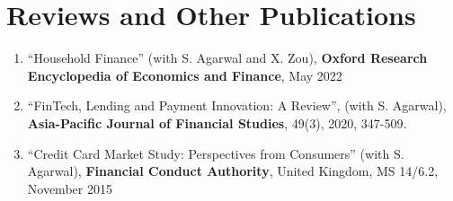 \documentclass[margin,line]{res}
\begin{document}
\begin{resume}
\begin{enumerate}

\end{enumerate}

\section{\sc Reviews and Other Publications}
\begin{enumerate}
\item %
``Household Finance'' (with S. Agarwal and X. Zou), \textbf{Oxford Research Encyclopedia of Economics and Finance}, May 2022
\vspace*{0.2cm} 	
\item %
``FinTech, Lending and Payment Innovation: A Review'', (with S. Agarwal), \textbf{Asia-Pacific Journal of Financial Studies}, 49(3), 2020, 347-509.
\vspace*{0.2cm} 	
	\item %
 ``Credit Card Market Study: Perspectives from Consumers'' (with S. Agarwal), \textbf{Financial Conduct Authority}, United Kingdom, MS 14/6.2, November 2015

\end{enumerate}

\iffalse


\end{resume}
\end{document}
